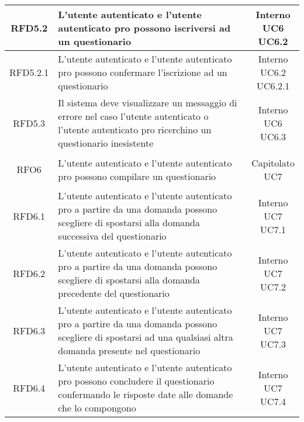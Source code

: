 \begin{longtable}{|c|>{\centering}m{7cm}|c|}
			 \hypertarget{{RFD5.2}}{{RFD5.2}} & L’utente autenticato e l’utente autenticato pro possono iscriversi ad un questionario & \makecell{Interno\\ UC6 \\UC6.2 } \\ \hline
			 \hypertarget{{RFD5.2.1}}{{RFD5.2.1}} & L’utente autenticato e l’utente autenticato pro possono confermare l’iscrizione ad un questionario & \makecell{Interno\\ UC6.2 \\UC6.2.1 } \\ \hline
			 \hypertarget{{RFD5.3}}{{RFD5.3}} & Il sistema deve visualizzare un messaggio di errore nel caso l’utente autenticato o l’utente autenticato pro ricerchino un questionario inesistente  & \makecell{Interno\\ UC6 \\UC6.3 } \\ \hline
			 \hypertarget{{RFO6}}{{RFO6}} & L’utente autenticato e l’utente autenticato pro possono compilare un questionario & \makecell{Capitolato\\ UC7 } \\ \hline
			 \hypertarget{{RFD6.1}}{{RFD6.1}} & L’utente autenticato e l’utente autenticato pro a partire da una domanda possono scegliere di spostarsi alla domanda successiva del questionario  & \makecell{Interno\\ UC7 \\UC7.1 } \\ \hline
			 \hypertarget{{RFD6.2}}{{RFD6.2}} & L’utente autenticato e l’utente autenticato pro a partire da una domanda possono scegliere di spostarsi alla domanda precedente del questionario & \makecell{Interno\\ UC7 \\UC7.2 } \\ \hline
			 \hypertarget{{RFD6.3}}{{RFD6.3}} & L’utente autenticato e l’utente autenticato pro a partire da una domanda possono scegliere di spostarsi ad una qualsiasi altra domanda presente nel questionario & \makecell{Interno\\ UC7 \\UC7.3 } \\ \hline
			 \hypertarget{{RFD6.4}}{{RFD6.4}} & L’utente autenticato e l’utente autenticato pro possono concludere il questionario confermando le risposte date alle domande che lo compongono  & \makecell{Interno\\ UC7 \\UC7.4 } \\ \hline

\end{longtable}
